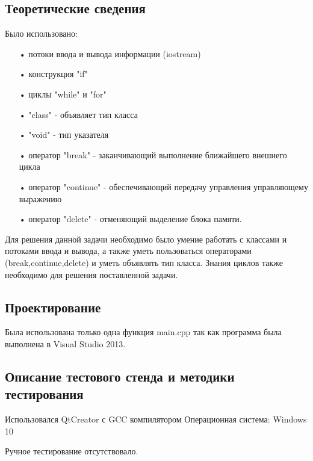 \documentclass[12pt,a4paper]{report}
\begin{document}
\subsection{Теоретические сведения}

Было использовано:
\begin{enumerate}
\item[•] потоки ввода и вывода информации (iostream)
\item[•] конструкция "if"
\item[•] циклы "while" и "for"
\item[•] "class" - объявляет тип класса 
\item[•] "void" - тип указателя
\item[•] оператор "break" - заканчивающий выполнение ближайшего внешнего цикла 
\item[•] оператор "continue" - обеспечивающий передачу управления управляющему выражению
\item[•] оператор "delete" - отменяющий выделение блока памяти.  
\end{enumerate}

Для решения данной задачи необходимо было умение работать с классами и потоками ввода и вывода, а также уметь пользоваться операторами (break,continue,delete) и уметь объявлять тип класса.
Знания циклов также необходимо для решения поставленной задачи.

\subsection{Проектирование}
Была использована только одна функция main.cpp так как программа была выполнена в Visual Studio 2013.

\subsection{Описание тестового стенда и методики тестирования}

Использовался QtCreator с GCC компилятором
Операционная система: Windows 10

Ручное тестирование отсутствовало.
\end{document}
